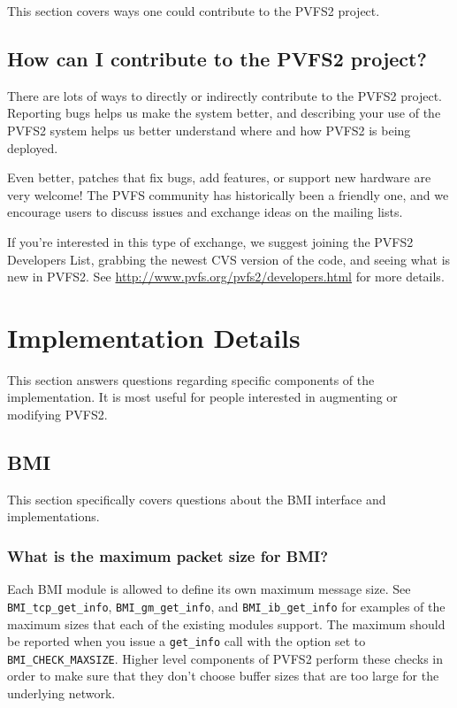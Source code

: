 \documentclass[11pt,letterpaper]{article}
\begin{document}
This section covers ways one could contribute to the PVFS2 project.

\subsection{How can I contribute to the PVFS2 project?}
\label{sec:contributing}

There are lots of ways to directly or indirectly contribute to the PVFS2
project.  Reporting bugs helps us make the system better, and describing your
use of the PVFS2 system helps us better understand where and how PVFS2 is
being deployed.

Even better, patches that fix bugs, add features, or support new hardware are
very welcome!  The PVFS community has historically been a friendly one, and we
encourage users to discuss issues and exchange ideas on the mailing lists.

If you're interested in this type of exchange, we suggest joining the PVFS2
Developers List, grabbing the newest CVS version of the code, and seeing what
is new in PVFS2.  See \url{http://www.pvfs.org/pvfs2/developers.html} for more
details.

%
%
\section{Implementation Details}

This section answers questions regarding specific components of the
implementation.  It is most useful for people interested in augmenting or
modifying PVFS2.

\subsection{BMI}

This section specifically covers questions about the BMI interface and
implementations.

\subsubsection{What is the maximum packet size for BMI?}

Each BMI module is allowed to define its own maximum message size.  See
\texttt{BMI\_tcp\_get\_info}, \texttt{BMI\_gm\_get\_info}, and
\texttt{BMI\_ib\_get\_info} for examples of the maximum sizes that each of the
existing modules support.  The maximum should be reported when you issue a
\texttt{get\_info} call with the option set to \texttt{BMI\_CHECK\_MAXSIZE}.
Higher level components of PVFS2 perform these checks in order to make sure
that they don't choose buffer sizes that are too large for the underlying
network.
\end{document}
